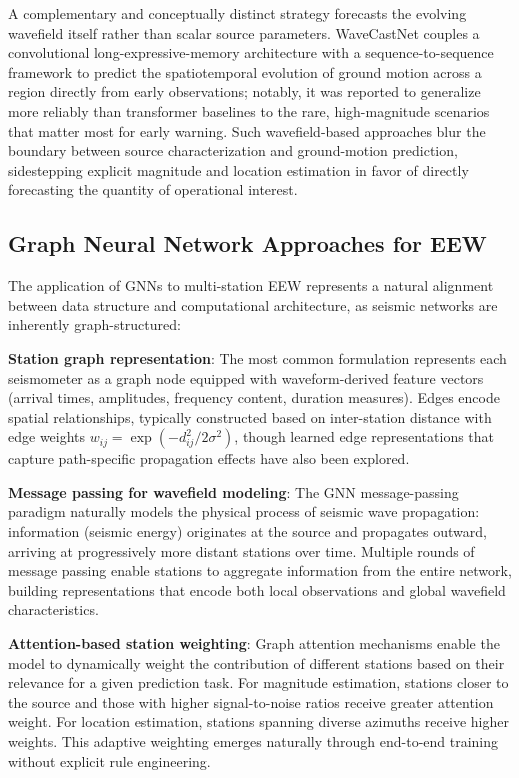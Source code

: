 \documentclass[review,authoryear]{elsarticle}
\begin{document}
A complementary and conceptually distinct strategy forecasts the evolving wavefield itself rather than scalar source parameters. WaveCastNet \citep{lyu2025wavecastnet} couples a convolutional long-expressive-memory architecture with a sequence-to-sequence framework to predict the spatiotemporal evolution of ground motion across a region directly from early observations; notably, it was reported to generalize more reliably than transformer baselines to the rare, high-magnitude scenarios that matter most for early warning. Such wavefield-based approaches blur the boundary between source characterization and ground-motion prediction, sidestepping explicit magnitude and location estimation in favor of directly forecasting the quantity of operational interest.

\subsection{Graph Neural Network Approaches for EEW}

The application of GNNs to multi-station EEW represents a natural alignment between data structure and computational architecture, as seismic networks are inherently graph-structured:

\textbf{Station graph representation}: The most common formulation represents each seismometer as a graph node equipped with waveform-derived feature vectors (arrival times, amplitudes, frequency content, duration measures). Edges encode spatial relationships, typically constructed based on inter-station distance with edge weights $w_{ij} = \exp(-d_{ij}^2 / 2\sigma^2)$, though learned edge representations that capture path-specific propagation effects have also been explored.

\textbf{Message passing for wavefield modeling}: The GNN message-passing paradigm naturally models the physical process of seismic wave propagation: information (seismic energy) originates at the source and propagates outward, arriving at progressively more distant stations over time. Multiple rounds of message passing enable stations to aggregate information from the entire network, building representations that encode both local observations and global wavefield characteristics.

\textbf{Attention-based station weighting}: Graph attention mechanisms \citep{velickovic2018graph} enable the model to dynamically weight the contribution of different stations based on their relevance for a given prediction task. For magnitude estimation, stations closer to the source and those with higher signal-to-noise ratios receive greater attention weight. For location estimation, stations spanning diverse azimuths receive higher weights. This adaptive weighting emerges naturally through end-to-end training without explicit rule engineering.
\end{document}
